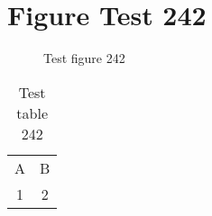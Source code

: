 \documentclass{article}
\begin{document}
\section{Figure Test 242}
\begin{figure}[h]
\caption{Test figure 242}
\end{figure}
\begin{table}[h]
\caption{Test table 242}
\begin{tabular}{cc}
A & B \\
1 & 2
\end{tabular}
\end{table}
\end{document}
